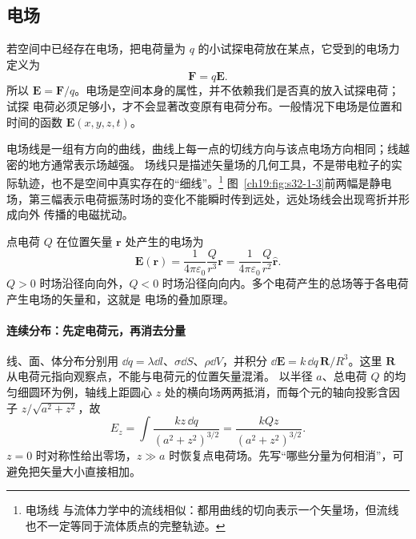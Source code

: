 \subsection{电场}


若空间中已经存在电场，把电荷量为 $q$ 的小试探电荷放在某点，它受到的电场力定义为
\begin{equation}
  \boxed{\boldsymbol F=q\boldsymbol E}.
\end{equation}
所以 $\boldsymbol E=\boldsymbol F/q$。电场是空间本身的属性，并不依赖我们是否真的放入试探电荷；试探
电荷必须足够小，才不会显著改变原有电荷分布。一般情况下电场是位置和时间的函数
$\boldsymbol E(x,y,z,t)$。

电场线是一组有方向的曲线，曲线上每一点的切线方向与该点电场方向相同；线越密的地方通常表示场越强。
场线只是描述矢量场的几何工具，不是带电粒子的实际轨迹，也不是空间中真实存在的“细线”。\footnote{电场线
与流体力学中的流线相似：都用曲线的切向表示一个矢量场，但流线也不一定等同于流体质点的完整轨迹。}
图~\ref{ch19:fig:s32-1-3}前两幅是静电场，第三幅表示电荷振荡时场的变化不能瞬时传到远处，远处场线会出现弯折并形成向外
传播的电磁扰动。

\par\noindent\begin{minipage}{\linewidth}
\fieldLineGallery
{}\label{ch19:fig:s32-1-3}
\end{minipage}\par\medskip

点电荷 $Q$ 在位置矢量 $\boldsymbol r$ 处产生的电场为
\begin{equation}
  \boxed{\boldsymbol E(\boldsymbol r)
  =\frac{1}{4\pi\varepsilon_0}\frac{Q}{r^3}\boldsymbol r
  =\frac{1}{4\pi\varepsilon_0}\frac{Q}{r^2}\hat{\boldsymbol r}}.
\end{equation}
$Q>0$ 时场沿径向向外，$Q<0$ 时场沿径向向内。多个电荷产生的总场等于各电荷产生电场的矢量和，这就是
电场的叠加原理。


\paragraph{连续分布：先定电荷元，再消去分量}
线、面、体分布分别用 $\dd q=\lambda\dd l$、$\sigma\dd S$、$\rho\dd V$，并积分
$\dd\boldsymbol E=k\,\dd q\,\boldsymbol R/R^3$。这里 $\boldsymbol R$ 从电荷元指向观察点，不能与电荷元的位置矢量混淆。
以半径 $a$、总电荷 $Q$ 的均匀细圆环为例，轴线上距圆心 $z$ 处的横向场两两抵消，而每个元的轴向投影含因子 $z/\sqrt{a^2+z^2}$，故
\[
 E_z=\int\frac{kz\,\dd q}{(a^2+z^2)^{3/2}}
 =\frac{kQz}{(a^2+z^2)^{3/2}}.
\]
$z=0$ 时对称性给出零场，$z\gg a$ 时恢复点电荷场。先写“哪些分量为何相消”，可避免把矢量大小直接相加。


